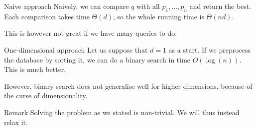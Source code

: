 \documentclass[a4paper]{article}
\begin{document}
\begin{parag}{Naive approach}
    Naively, we can compare $q$ with all $p_1, \ldots, p_n$ and return the best. Each comparison takes time $\Theta\left(d\right)$, so the whole running time is $\Theta\left(nd\right)$.

    This is however not great if we have many queries to do.
\end{parag}

\begin{parag}{One-dimensional approach}
    Let us suppose that $d = 1$ as a start. If we preprocess the database by sorting it, we can do a binary search in time $O\left(\log\left(n\right)\right)$. This is much better.

    However, binary search does not generalise well for higher dimensions, because of the curse of dimensionality.

    \begin{subparag}{Remark}
        Solving the problem as we stated is non-trivial. We will thus instead relax it.
    \end{subparag}
\end{parag}
\end{document}
